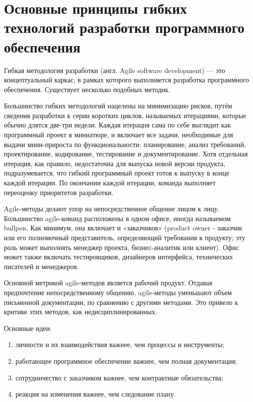 \documentclass{article}
\let\stdsection\section
\renewcommand\section{\newpage\stdsection}
\begin{document}
\section{Основные принципы гибких технологий разработки программного обеспечения}
    Гибкая методология разработки (англ. Agile software development) — это концептуальный каркас, в рамках которого выполняется разработка программного обеспечения. Существует несколько подобных методик.

    Большинство гибких методологий нацелены на минимизацию рисков, путём сведения разработки к серии коротких циклов, называемых итерациями, которые обычно длятся две-три недели. Каждая итерация сама по себе выглядит как программный проект в миниатюре, и включает все задачи, необходимые для выдачи мини-прироста по функциональности: планирование, анализ требований, проектирование, кодирование, тестирование и документирование. Хотя отдельная итерация, как правило, недостаточна для выпуска новой версии продукта, подразумевается, что гибкий программный проект готов к выпуску в конце каждой итерации. По окончании каждой итерации, команда выполняет переоценку приоритетов разработки.

    Agile-методы делают упор на непосредственное общение лицом к лицу. Большинство agile-команд расположены в одном офисе, иногда называемом bullpen. Как минимум, она включает и «заказчиков» (product owner - заказчик или его полномочный представитель, определяющий требования к продукту; эту роль может выполнять менеджер проекта, бизнес-аналитик или клиент). Офис может также включать тестировщиков, дизайнеров интерфейса, технических писателей и менеджеров.

    Основной метрикой agile-методов является рабочий продукт. Отдавая предпочтение непосредственному общению, agile-методы уменьшают объем письменной документации, по сравнению с другими методами. Это привело к критике этих методов, как недисциплинированных.

    Основные идеи:
    \begin{enumerate}
        \item личности и их взаимодействия важнее, чем процессы и инструменты;
        \item работающее программное обеспечение важнее, чем полная документация;
        \item сотрудничество с заказчиком важнее, чем контрактные обязательства;
        \item реакция на изменения важнее, чем следование плану.
    \end{enumerate}
\end{document}
